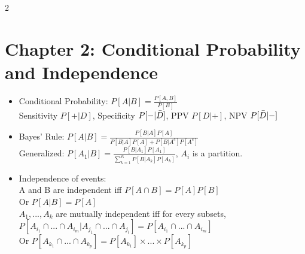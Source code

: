 \documentclass[a4paper,10pt]{article}
\begin{document}
\begin{multicols}{2}
\section*{Chapter 2: Conditional Probability and Independence}
\begin{itemize}
    \item Conditional Probability: $P[A|B]=\frac{P[A,B]}{P[B]}$\\
    Sensitivity $P[+|D]$, Specificity $P[-|\Bar{D}]$, PPV $P[D|+]$, NPV $P[\Bar{D}|-]$
    \item Bayes' Rule: $P[A|B]=\frac{P[B|A]P[A]}{P[B|A]P[A]+P[B|A^c]P[A^c]}$\\
    Generalized: $P[A_1|B]=\frac{P[B|A_1]P[A_1]}{\sum_{k=1}^K P[B|A_k]P[A_k]}$, $A_i$ is a partition.
    \item Independence of events:\\
    A and B are independent iff $P[A\cap B]=P[A]P[B]$\\ Or $P[A|B]=P[A]$\\
    $A_1,...,A_k$ are mutually independent iff for every subsets, $P[A_{i_1}\cap ...\cap A_{i_m}|A_{j_1}\cap ...\cap A_{j_l}]=P[A_{i_1}\cap ...\cap A_{i_m}]$\\
    Or $P[A_{k_1}\cap ...\cap A_{k_p}]=P[A_{k_1}]\times ...\times P[A_{k_p}]$
\end{itemize}


\end{multicols}
\end{document}
